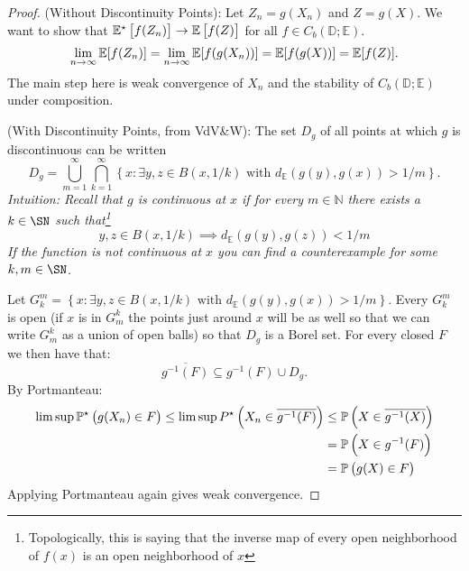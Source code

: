 \begin{proof}
	(Without Discontinuity Points):
	Let \(Z_n = g(X_n)\) and  \(Z = g(X)\). We want to show that  \(\E^\star\left[f(Z_n)\right] \to \E\left[f(Z)\right]\) for all \(f \in C_b(\mathbb{D};\mathbb{E})\).
	\[
		\lim_{n\to\infty} \E[f(Z_n)] = \lim_{n\to\infty}\E[f(g(X_n))] = \E[f(g(X))] = \E[f(Z)]
	.\]
	The main step here is weak convergence of \(X_n\) and the stability of  \(C_b(\mathbb{D};\mathbb{E})\) under composition.

	(With Discontinuity Points, from VdV\&W):
	The set \(D_g\) of all points at which  \(g\) is discontinuous can be written
	\[
		D_g = \bigcup_{m=1}^\infty\bigcap_{k=1}^\infty \left\{x : \exists y,z \in B(x,1/k) \text{ with }d_\mathbb{E}(g(y),g(x)) > 1/m\right\}
	.\] 
	\textit{Intuition: Recall that \(g\) is continuous at  \(x\) if for every  \(m \in \mathbb{N}\) there exists a  \(k \in \SN\) such that\footnote{Topologically, this is saying that the inverse map of every open neighborhood of \(f(x)\) is an open neighborhood of  \(x\)}  \[y,z \in B(x,1/k)\implies d_\mathbb{E}(g(y),g(z)) < 1/m\] If the function is not continuous at \(x\) you can find a counterexample for some  \(k,m\in\SN\).}
	
	Let \(G_k^m = \left\{x : \exists y,z \in B(x,1/k) \text{ with }d_\mathbb{E}(g(y),g(x)) > 1/m\right\}\). Every \(G_k^m\) is open (if \(x\) is in  \(G_m^k\) the points just around  \(x\) will be as well so that we can write \(G_m^k\) as a union of open balls) so that \(D_g\) is a Borel set. For every closed  \(F\) we then have that:
	 \[
		 \overline{g^{-1}(F)} \subseteq g^{-1}(F)\cup D_g
	.\]
	By Portmanteau:
	\begin{align*}
		\lim\sup \P^\star\left(g(X_n)\in F\right) \leq  \lim \sup P^\star\left(X_n \in \overline{g^{-1}(F)}\right) &\leq \P\left(X \in \overline{g^{-1}(X)}\right) \\ &= \P\left(X \in g^{-1}(F)\right) \\ &= \P\left(g(X) \in F\right)
	\end{align*}
	Applying Portmanteau again gives weak convergence.
\end{proof}
